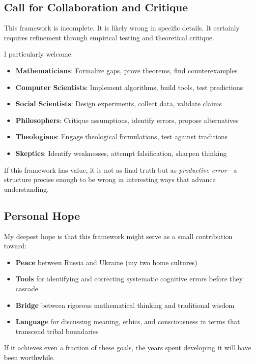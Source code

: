 \documentclass[11pt,a4paper]{article}
\theoremstyle{definition}
\theoremstyle{remark}
\begin{document}
\subsection{Call for Collaboration and Critique}

This framework is incomplete. It is likely wrong in specific details. It certainly requires refinement through empirical testing and theoretical critique.

I particularly welcome:
\begin{itemize}
\item \textbf{Mathematicians}: Formalize gaps, prove theorems, find counterexamples
\item \textbf{Computer Scientists}: Implement algorithms, build tools, test predictions
\item \textbf{Social Scientists}: Design experiments, collect data, validate claims
\item \textbf{Philosophers}: Critique assumptions, identify errors, propose alternatives
\item \textbf{Theologians}: Engage theological formulations, test against traditions
\item \textbf{Skeptics}: Identify weaknesses, attempt falsification, sharpen thinking
\end{itemize}

If this framework has value, it is not as final truth but as \textit{productive error}—a structure precise enough to be wrong in interesting ways that advance understanding.

\subsection{Personal Hope}

My deepest hope is that this framework might serve as a small contribution toward:
\begin{itemize}
\item \textbf{Peace} between Russia and Ukraine (my two home cultures)
\item \textbf{Tools} for identifying and correcting systematic cognitive errors before they cascade
\item \textbf{Bridge} between rigorous mathematical thinking and traditional wisdom
\item \textbf{Language} for discussing meaning, ethics, and consciousness in terms that transcend tribal boundaries
\end{itemize}

If it achieves even a fraction of these goals, the years spent developing it will have been worthwhile.
\end{document}
